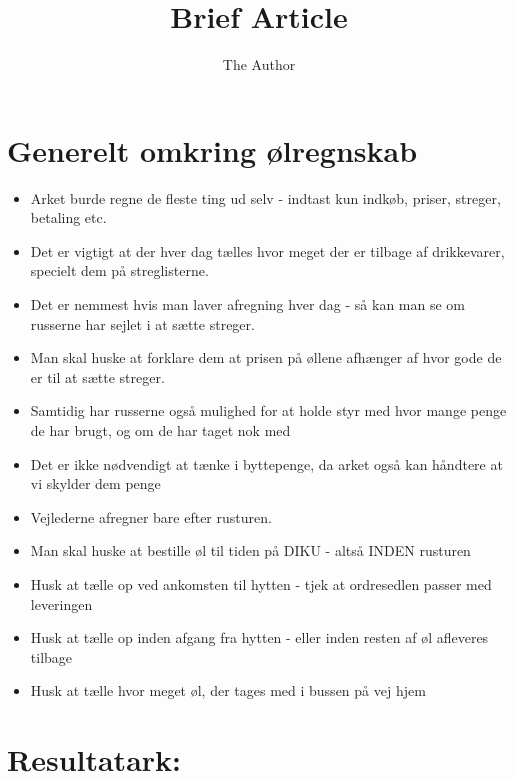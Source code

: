 \documentclass[11pt]{article} %
\title{Brief Article}
\author{The Author}
\begin{document}
\maketitle

\section*{Generelt omkring ølregnskab}

\begin{itemize}
\item Arket burde regne de fleste ting ud selv - indtast kun indkøb, priser, streger, betaling etc.

\item Det er vigtigt at der hver dag tælles hvor meget der er tilbage af drikkevarer, specielt dem på streglisterne.

\item Det er nemmest hvis man laver afregning hver dag - så kan man se om russerne har sejlet i at sætte streger.

\item Man skal huske at forklare dem at prisen på øllene afhænger af hvor gode de er til at sætte streger.

\item Samtidig har russerne også mulighed for at holde styr med hvor mange penge de har brugt, og om de har taget nok med

\item Det er ikke nødvendigt at tænke i byttepenge, da arket også kan håndtere at vi skylder dem penge

\item Vejlederne afregner bare efter rusturen.

\item Man skal huske at bestille øl til tiden på DIKU - altså INDEN rusturen

\item Husk at tælle op ved ankomsten til hytten - tjek at ordresedlen passer med leveringen

\item Husk at tælle op inden afgang fra hytten - eller inden resten af øl afleveres tilbage

\item Husk at tælle hvor meget øl, der tages med i bussen på vej hjem

\end{itemize}

\section*{Resultatark:}
\end{document}
